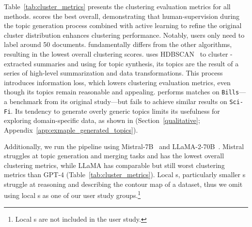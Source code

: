 %
Table~\ref{tab:cluster_metrics} presents the clustering evaluation metrics for all methods. \bass{} scores the best overall, demonstrating that human-supervision
during the topic generation process combined with active learning to
refine the original  cluster distribution enhances clustering performance. Notably, users only need to label around 50 documents.
%
\lloom{} fundamentally differs from the other algorithms, resulting in the lowest overall clustering scores.
%
\lloom{} uses HDBSCAN~\cite{10.1007/978-3-642-37456-2_14} to cluster
\mm{}-extracted summaries and using \mm{} for topic synthesis,
its topics are the result of a series of high-level summarization and data
transformations. This process introduces information loss, which lowers clustering evaluation metrics, even though its topics remain reasonable and appealing.
%
\topicgpt{} performs matches \lda{} on \texttt{Bills}---a benchmark from its original study---but fails to achieve similar results on \texttt{Sci-Fi}.
%
Its tendency to generate overly generic topics limits its usefulness for exploring domain-specific data, as shown in (Section~\ref{qualitative}; Appendix~\ref{app:exmaple_generated_topics}).

%


Additionally, we run the \topicgpt{} pipeline using 
Mistral-7B~\cite{jiang2023mistral} and LLaMA-2-70B~\cite{touvron2023llama}.
%
Mistral struggles at topic generation and merging tasks and has the lowest overall clustering metrics, while LLaMA has comparable but still worst clustering metrics than GPT-4 (Table~\ref{tab:cluster_metrics}).
%
Local \mm{}s, particularly smaller \mm{}s struggle at reasoning and describing the contour map of a dataset, thus we omit using local \mm{}s as one of our user study groups.\footnote{Local \mm{}s are not included in the user study.}

